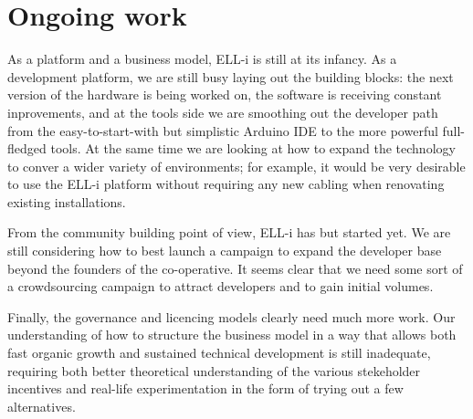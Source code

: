 \documentclass[final]{siamltex}
\begin{document}
%


\section{Ongoing work}
\label{sec:ongoing}

As a platform and a business model, ELL-i is still at its infancy.  As
a development platform, we are still busy laying out the building
blocks: the next version of the hardware is being worked on, the
software is receiving constant inprovements, and at the tools side we
are smoothing out the developer path from the easy-to-start-with but
simplistic Arduino IDE to the more powerful full-fledged tools.  At
the same time we are looking at how to expand the technology to conver
a wider variety of environments; for example, it would be very
desirable to use the ELL-i platform without requiring any new cabling
when renovating existing installations.

From the community building point of view, ELL-i has but started yet.
We are still considering how to best launch a campaign to expand the
developer base beyond the founders of the co-operative.  It seems
clear that we need some sort of a crowdsourcing campaign to attract
developers and to gain initial volumes.

Finally, the governance and licencing models clearly need much more
work.  Our understanding of how to structure the business model in a
way that allows both fast organic growth and sustained technical
development is still inadequate, requiring both better theoretical
understanding of the various stekeholder incentives and real-life
experimentation in the form of trying out a few alternatives.
\end{document}
